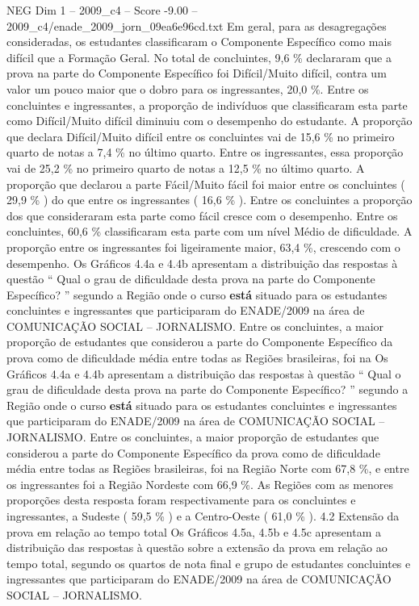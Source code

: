 \begin{textsample}{NEG Dim 1 – 2009\_c4 – Score -9.00 – 2009\_c4/enade\_2009\_jorn\_09ea6e96cd.txt}
Em geral, para as desagregações consideradas, os estudantes classificaram o Componente Específico como mais difícil que a Formação Geral.
No total de concluintes, 9,6 \% declararam que a prova na parte do Componente Específico foi Difícil/Muito difícil, contra um valor um pouco maior que o dobro para os ingressantes, 20,0 \%.
Entre os concluintes e ingressantes, a proporção de indivíduos que classificaram esta parte como Difícil/Muito difícil diminuiu com o desempenho do estudante.
A proporção que declara Difícil/Muito difícil entre os concluintes vai de 15,6 \% no primeiro quarto de notas a 7,4 \% no último quarto.
Entre os ingressantes, essa proporção vai de 25,2 \% no primeiro quarto de notas a 12,5 \% no último quarto.
A proporção que declarou a parte Fácil/Muito fácil foi maior entre os concluintes ( 29,9 \% ) do que entre os ingressantes ( 16,6 \% ).
Entre os concluintes a proporção dos que consideraram esta parte como fácil cresce com o desempenho.
Entre os concluintes, 60,6 \% classificaram esta parte com um nível Médio de dificuldade.
A proporção entre os ingressantes foi ligeiramente maior, 63,4 \%, crescendo com o desempenho.
Os Gráficos 4.4a e 4.4b apresentam a distribuição das respostas à questão “ Qual o grau de dificuldade desta prova na parte do Componente Específico? ” segundo a Região onde o curso \textbf{está} situado para os estudantes concluintes e ingressantes que participaram do ENADE/2009 na área de COMUNICAÇÃO SOCIAL – JORNALISMO.
Entre os concluintes, a maior proporção de estudantes que considerou a parte do Componente Específico da prova como de dificuldade média entre todas as Regiões brasileiras, foi na Os Gráficos 4.4a e 4.4b apresentam a distribuição das respostas à questão “ Qual o grau de dificuldade desta prova na parte do Componente Específico? ” segundo a Região onde o curso \textbf{está} situado para os estudantes concluintes e ingressantes que participaram do ENADE/2009 na área de COMUNICAÇÃO SOCIAL – JORNALISMO.
Entre os concluintes, a maior proporção de estudantes que considerou a parte do Componente Específico da prova como de dificuldade média entre todas as Regiões brasileiras, foi na Região Norte com 67,8 \%, e entre os ingressantes foi a Região Nordeste com 66,9 \%.
As Regiões com as menores proporções desta resposta foram respectivamente para os concluintes e ingressantes, a Sudeste ( 59,5 \% ) e a Centro-Oeste ( 61,0 \% ). 4.2 Extensão da prova em relação ao tempo total Os Gráficos 4.5a, 4.5b e 4.5c apresentam a distribuição das respostas à questão sobre a extensão da prova em relação ao tempo total, segundo os quartos de nota final e grupo de estudantes concluintes e ingressantes que participaram do ENADE/2009 na área de COMUNICAÇÃO SOCIAL – JORNALISMO.

\end{textsample}
